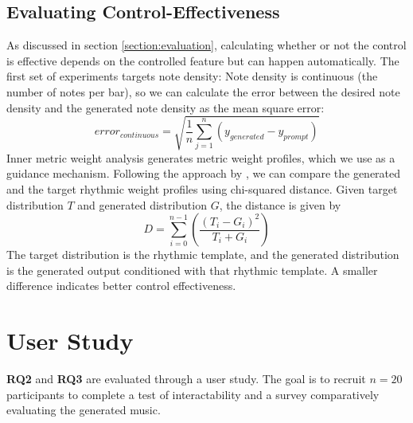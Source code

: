 \subsection{Evaluating Control-Effectiveness}
As discussed in section \ref{section:evaluation}, calculating whether or not the control is effective depends on the controlled feature but can happen automatically. 
The first set of experiments targets note density: 
Note density is continuous (the number of notes per bar), so we can calculate the error between the desired note density and the generated note density as the mean square error: 
\begin{equation}
 error_{continuous} = \sqrt{\frac{1}{n}\sum_{j=1}^{n}(y_{generated}-y_{prompt})}
\end{equation}
Inner metric weight analysis generates metric weight profiles, which we use as a guidance mechanism. Following the approach by \cite{Bemman2024}, we can compare the generated and the target rhythmic weight profiles using chi-squared distance.
Given target distribution $T$ and generated distribution $G$, the distance is given by 
\begin{equation}
D=\sum_{i=0}^{n-1}(\frac{(T_i-G_i)^2}{T_i+G_i})
\end{equation}
The target distribution is the rhythmic template, and the generated distribution is the generated output conditioned with that rhythmic template. A smaller difference indicates better control effectiveness. 

\section{User Study}
\textbf{RQ2} and \textbf{RQ3} are evaluated through a user study. The goal is to recruit $n=20$ participants to complete a test of interactability and a survey comparatively evaluating the generated music. 
